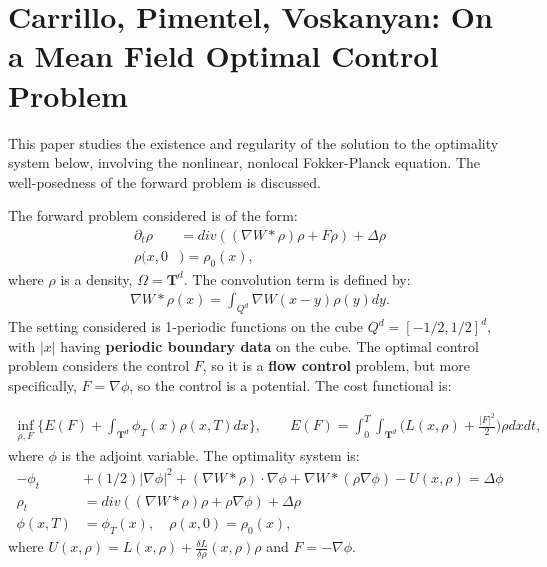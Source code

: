 \documentclass[11pt, a4paper]{article}
\theoremstyle{definition}
\begin{document}
\section{Carrillo, Pimentel, Voskanyan: On a Mean Field Optimal Control Problem \cite{carrillo2019mean}}
This paper studies the existence and regularity of the solution to the optimality system below, involving the nonlinear, nonlocal Fokker-Planck equation. The well-posedness of the forward problem is discussed.

The forward problem considered is of the form:
\begin{align*}
\partial_t \rho &= div ((\nabla W \ast \rho)\rho + F\rho) + \Delta \rho\\
\rho(x,0 &)= \rho_0(x),
\end{align*}
where $\rho$ is a density, $\Omega=\mathbf{T}^d$. The convolution term is defined by:
\begin{align*}
\nabla W \ast \rho(x) = \int_{Q^d} \nabla W (x-y) \rho(y) dy.
\end{align*}
The setting considered is 1-periodic functions on the cube $Q^d=[-1/2,1/2]^d$, with $|x|$ having \textbf{periodic boundary data} on the cube. 
The optimal control problem considers the control $F$, so it is a \textbf{flow control} problem, but more specifically, $F= \nabla \phi$, so the control is a potential.
The cost functional is:

\begin{align*}
\inf_{\rho,F} \{ E(F) + \int_{\mathbf{T}^d} \phi_T(x) \rho(x,T)dx\}, \qquad
E(F) = \int_0^T \int_{\mathbf{T}^d} \bigg( L(x,\rho) + \frac{|F|^2}{2} \bigg) \rho dx dt,
\end{align*}
where $\phi$ is the adjoint variable.
The optimality system is:
\begin{align*}
- \phi_t &+ (1/2) |\nabla \phi|^2 + (\nabla W \ast \rho)\cdot \nabla \phi + \nabla W \ast (\rho \nabla \phi) -U(x, \rho)= \Delta \phi\\
\rho_t &= div((\nabla W \ast \rho)\rho + \rho \nabla \phi)+ \Delta \rho\\
\phi(x,T) &=\phi_T(x), \quad \rho(x,0)= \rho_0(x),
\end{align*}
where $U(x,\rho) = L(x,\rho) + \frac{\delta L}{\delta \rho}(x,\rho)\rho$ and $F=-\nabla \phi$.
\end{document}
